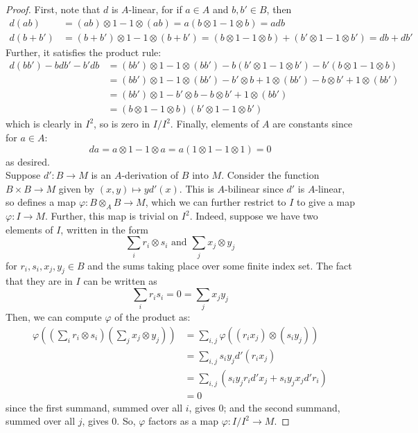 \begin{proof}
	First, note that $d$ is $A$-linear, for if $a \in A$ and $b,b' \in B$, then
	\begin{align*}
		d(ab) &= (ab) \otimes 1 - 1 \otimes (ab) = a(b \otimes 1 - 1 \otimes b) = adb \\
		d(b+b') &= (b+b') \otimes 1 - 1 \otimes (b+b') = (b \otimes 1 - 1 \otimes b)+(b' \otimes 1 - 1 \otimes b') = db+db'
	\end{align*}
	Further, it satisfies the product rule:
	\begin{align*}
	d(bb')-bdb'-b'db
		&= (bb') \otimes 1 - 1 \otimes (bb') - b(b' \otimes 1 - 1 \otimes b') - b'(b \otimes 1 - 1 \otimes b) \\
		&= (bb') \otimes 1 - 1 \otimes (bb') - b' \otimes b + 1 \otimes (bb') - b \otimes b' + 1 \otimes (bb') \\
		&= (bb') \otimes 1 - b' \otimes b - b \otimes b' + 1 \otimes (bb') \\
		&= (b \otimes 1 - 1 \otimes b)(b' \otimes 1 - 1 \otimes b')
	\end{align*}
	which is clearly in $I^2$, so is zero in $I/I^2$. Finally, elements of $A$ are constants since for $a \in A$:
	\[ da = a \otimes 1 - 1 \otimes a = a(1 \otimes 1 - 1 \otimes 1) = 0 \]
	as desired. \\
	
	Suppose $d' : B \to M$ is an $A$-derivation of $B$ into $M$. Consider the function $B \times B \to M$ given by $(x,y) \mapsto yd'(x)$. This is $A$-bilinear since $d'$ is $A$-linear, so defines a map $\varphi : B \otimes_A B \to M$, which we can further restrict to $I$ to give a map $\varphi : I \to M$. Further, this map is trivial on $I^2$. Indeed, suppose we have two elements of $I$, written in the form
	\[ \sum_i r_i \otimes s_i \text{ and } \sum_j x_j \otimes y_j \]
	for $r_i,s_i,x_j,y_j \in B$ and the sums taking place over some finite index set. The fact that they are in $I$ can be written as
	\[ \sum_i r_is_i = 0 = \sum_j x_jy_j \]
	Then, we can compute $\varphi$ of the product as:
	\begin{align*}
	\varphi\left(\left(\sum_i r_i \otimes s_i\right)\left(\sum_j x_j \otimes y_j\right)\right)
		&= \sum_{i,j} \varphi((r_ix_j) \otimes (s_iy_j)) \\
		&= \sum_{i,j} s_iy_jd'(r_ix_j) \\
		&= \sum_{i,j} (s_iy_jr_id'x_j + s_iy_jx_jd'r_i) \\
		&= 0
	\end{align*}
	since the first summand, summed over all $i$, gives 0; and the second summand, summed over all $j$, gives 0. So, $\varphi$ factors as a map $\varphi : I/I^2 \to M$.
	

\end{proof}
